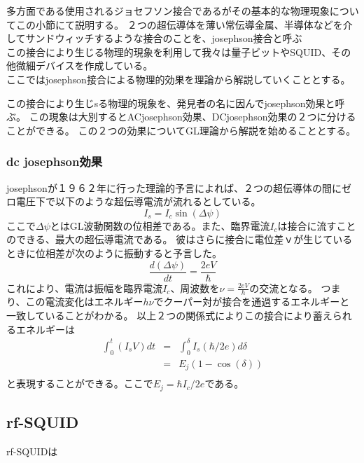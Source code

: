             多方面である使用されるジョセフソン接合であるがその基本的な物理現象についてこの小節にて説明する。
            ２つの超伝導体を薄い常伝導金属、半導体などを介してサンドウィッチするような接合のことを、josephson接合と呼ぶ\\
            この接合により生じる物理的現象を利用して我々は量子ビットやSQUID、その他微細デバイスを作成している。\\
            ここではjosephson接合による物理的効果を理論から解説していくこととする。

    
            この接合により生じsる物理的現象を、発見者の名に因んでjosephson効果と呼ぶ。
            この現象は大別するとACjosephson効果、DCjosephson効果の２つに分けることができる。
            この２つの効果についてGL理論から解説を始めることとする。
            \subsubsection{dc josephson効果}
                josephsonが１９６２年に行った理論的予言によれば、２つの超伝導体の間にゼロ電圧下で以下のような超伝導電流が流れるとしている。
                \begin{equation*}
                    I_s = I_c \sin(\Delta \psi)
                \end{equation*}
                ここで$\Delta \psi$とはGL波動関数の位相差である。また、臨界電流$I_c$は接合に流すことのできる、最大の超伝導電流である。
                彼はさらに接合に電位差ｖが生じているときに位相差が次のように振動すると予言した。
                \begin{equation*}
                    \frac{d(\Delta \psi)}{dt} = \frac{2eV}{\hbar}
                \end{equation*}
                これにより、電流は振幅を臨界電流$I_c$、周波数を$\nu = \frac{2eV}{h}$の交流となる。
                つまり、この電流変化はエネルギー$h\nu$でクーパー対が接合を通過するエネルギーと一致していることがわかる。
                以上２つの関係式によりこの接合により蓄えられるエネルギーは
                \begin{eqnarray}
                    \int_0^{t} (I_s V)dt&=&\int_{0}^{\delta} I_s(\hbar/2e)d\delta\\
                    &=&E_j(1-\cos(\delta))\\
                \end{eqnarray}
                と表現することができる。ここで$E_j=\hbar I_c/2e$である。
    \subsection{rf-SQUID}
                rf-SQUIDは
